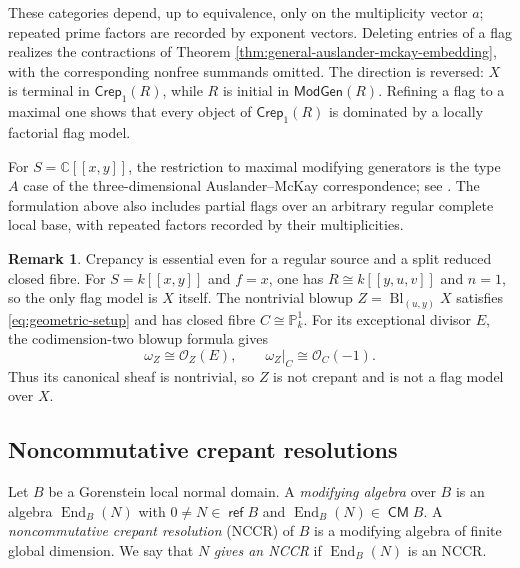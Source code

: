 \documentclass[a4paper,reqno]{amsart}
\def\O{\mathcal{O}}
\DeclareMathOperator{\CM}{\mathsf{CM}}
\DeclareMathOperator{\refl}{\mathsf{ref}}
\DeclareMathOperator{\End}{End}
\theoremstyle{definition}
\newtheorem{Rem}[Thm]{Remark}
\begin{document}
These categories depend, up to equivalence, only on the multiplicity vector $a$; repeated prime factors are recorded by exponent vectors. Deleting entries of a flag realizes the contractions of Theorem \ref{thm:general-auslander-mckay-embedding}, with the corresponding nonfree summands omitted. The direction is reversed: $X$ is terminal in $\mathsf{Crep}_1(R)$, while $R$ is initial in $\mathsf{ModGen}(R)$. Refining a flag to a maximal one shows that every object of $\mathsf{Crep}_1(R)$ is dominated by a locally factorial flag model.

For $S=\mathbb C[[x,y]]$, the restriction to maximal modifying generators is the type $A$ case of the three-dimensional Auslander--McKay correspondence; see \cite[Theorems 1.2 and 4.3]{Wem23survey}. The formulation above also includes partial flags over an arbitrary regular complete local base, with repeated factors recorded by their multiplicities.

\begin{Rem}
Crepancy is essential even for a regular source and a split reduced closed fibre. For $S=k[[x,y]]$ and $f=x$, one has $R\cong k[[y,u,v]]$ and $n=1$, so the only flag model is $X$ itself. The nontrivial blowup $Z=\operatorname{Bl}_{(u,y)}X$ satisfies \eqref{eq:geometric-setup} and has closed fibre $C\cong\mathbb P^1_k$. For its exceptional divisor $E$, the codimension-two blowup formula gives
\[
\omega_Z\cong\O_Z(E),\qquad \omega_Z|_C\cong\O_C(-1).
\]
Thus its canonical sheaf is nontrivial, so $Z$ is not crepant and is not a flag model over $X$.
\end{Rem}

\subsection{Noncommutative crepant resolutions}\label{sec:nccr}

Let $B$ be a Gorenstein local normal domain. A \emph{modifying algebra} over $B$ is an algebra $\End_B(N)$ with $0\ne N\in\refl B$ and $\End_B(N)\in\CM B$. A \emph{noncommutative crepant resolution} (NCCR) of $B$ is a modifying algebra of finite global dimension. We say that $N$ \emph{gives an NCCR} if $\End_B(N)$ is an NCCR.
\end{document}

